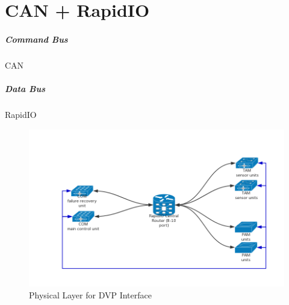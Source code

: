 \documentclass[12pt,article]{memoir}
\begin{document}
\section{CAN + RapidIO}
\subparagraph{Command Bus}CAN
\subparagraph{Data Bus}RapidIO\\
\begin{figure}[htp]
\includegraphics[width=\textwidth]{DR00001_RapidIO.png}
 \caption{Physical Layer for DVP Interface}	
\end{figure}
\newpage
\end{document}
